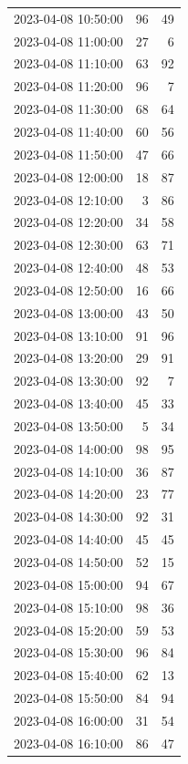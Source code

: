 \documentclass[
  letterpaper,
  DIV=11,
  numbers=noendperiod]{scrartcl}
\begin{document}
\begin{tabular}{lrr}
2023-04-08 10:50:00 &    96 &    49 \\
2023-04-08 11:00:00 &    27 &     6 \\
2023-04-08 11:10:00 &    63 &    92 \\
2023-04-08 11:20:00 &    96 &     7 \\
2023-04-08 11:30:00 &    68 &    64 \\
2023-04-08 11:40:00 &    60 &    56 \\
2023-04-08 11:50:00 &    47 &    66 \\
2023-04-08 12:00:00 &    18 &    87 \\
2023-04-08 12:10:00 &     3 &    86 \\
2023-04-08 12:20:00 &    34 &    58 \\
2023-04-08 12:30:00 &    63 &    71 \\
2023-04-08 12:40:00 &    48 &    53 \\
2023-04-08 12:50:00 &    16 &    66 \\
2023-04-08 13:00:00 &    43 &    50 \\
2023-04-08 13:10:00 &    91 &    96 \\
2023-04-08 13:20:00 &    29 &    91 \\
2023-04-08 13:30:00 &    92 &     7 \\
2023-04-08 13:40:00 &    45 &    33 \\
2023-04-08 13:50:00 &     5 &    34 \\
2023-04-08 14:00:00 &    98 &    95 \\
2023-04-08 14:10:00 &    36 &    87 \\
2023-04-08 14:20:00 &    23 &    77 \\
2023-04-08 14:30:00 &    92 &    31 \\
2023-04-08 14:40:00 &    45 &    45 \\
2023-04-08 14:50:00 &    52 &    15 \\
2023-04-08 15:00:00 &    94 &    67 \\
2023-04-08 15:10:00 &    98 &    36 \\
2023-04-08 15:20:00 &    59 &    53 \\
2023-04-08 15:30:00 &    96 &    84 \\
2023-04-08 15:40:00 &    62 &    13 \\
2023-04-08 15:50:00 &    84 &    94 \\
2023-04-08 16:00:00 &    31 &    54 \\
2023-04-08 16:10:00 &    86 &    47 \\

\end{tabular}
\end{document}
